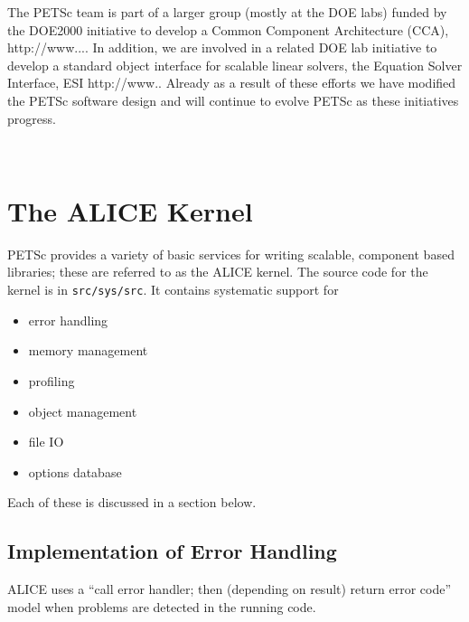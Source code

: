 \documentclass[twoside,12pt]{../sty/report_petsc}
\begin{document}
The PETSc team is part of a larger group (mostly at the DOE labs)
funded by the DOE2000 initiative to develop a Common Component
Architecture (CCA), http://www.... In addition, we are involved in a
related DOE lab initiative to develop a standard object interface for
scalable linear solvers, the Equation Solver Interface, ESI
http://www..  Already as a result of these efforts we have modified
the PETSc software design and will continue to evolve PETSc as these
initiatives progress. 

%
%

\newpage
\hbox{ }
\newpage

\chapter{The ALICE Kernel}
\label{chapter:kernel}
PETSc provides a variety of basic services for writing scalable, component 
based libraries; these are referred to as the ALICE kernel. The source
code for the kernel is in {\tt src/sys/src}. It contains systematic support for
\begin{itemize}
  \item error handling
  \item memory management
  \item profiling
  \item object management
  \item file IO
  \item options database
\end{itemize}
Each of these is discussed in a section below.

\section{Implementation of Error Handling}

ALICE  uses a ``call error handler; then (depending on result) return
error code'' model when problems are detected in the running code. 
\end{document}
